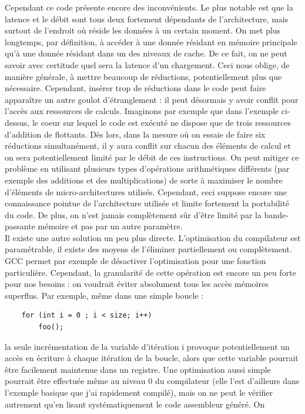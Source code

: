 \documentclass{report}
\begin{document}
Cependant ce code présente encore des inconvénients. Le plus notable est que la latence et le débit 
sont tous deux fortement dépendants de l'architecture, mais surtout de l'endroit où réside les données
à un certain moment. On met plus longtemps, par définition, à accéder à une donnée résidant en mémoire
principale qu'à une donnée résidant dans un des niveaux de cache. De ce fait, on ne peut savoir avec
certitude quel sera la latence d'un chargement. Ceci nous oblige, de manière générale, à mettre beaucoup
de réductions, potentiellement plus que nécessaire. Cependant, insérer trop de réductions dans le code
peut faire apparaître un autre goulot d'étranglement : il peut désormais y avoir conflit pour l'accès 
aux ressources de calculs. Imaginons par exemple que dans l'exemple ci-dessus, le coeur sur 
lequel le code est exécuté ne dispose que de trois ressources d'addition de flottants. Dès lors, dans
la mesure où on essaie de faire six réductions simultanément, il y aura conflit sur chacun des éléments
de calcul et on sera potentiellement limité par le débit de ces instructions. On peut mitiger ce 
problème en utilisant plusieurs types d'opérations arithmétiques différents (par exemple des additions
et des multiplications) de sorte à maximiser le nombre d'éléments de micro-architectures utilisés.
Cependant, ceci suppose encore une connaissance pointue de l'architecture utilisée et limite 
fortement la portabilité du code. De plus, on n'est jamais complètement sûr d'être limité par
la bande-passante mémoire et pas par un autre paramètre.
\\Il existe une autre solution un peu plus directe. L'optimisation du compilateur est paramétrable,
il existe des moyens de l'éliminer partiellement ou complètement. GCC permet par exemple de désactiver
l'optimisation pour une fonction particulière. Cependant, la granularité de cette opération est encore
un peu forte pour nos besoins : on voudrait éviter absolument tous les accès mémoires superflus. Par 
exemple, même dans une simple boucle : 
\begin{lstlisting}
    for (int i = 0 ; i < size; i++)
        foo();
\end{lstlisting}
la seule incrémentation de la variable d'itération i provoque potentiellement un accès en écriture
à chaque itération de la boucle, alors que cette variable pourrait être facilement maintenue
dans un registre. Une optimisation aussi simple pourrait être effectuée même au niveau
0 du compilateur (elle l'est d'ailleurs dans l'exemple basique que j'ai rapidement compilé), 
mais on ne peut le vérifier autrement qu'en lisant systématiquement le code assembleur généré. On
\end{document}
